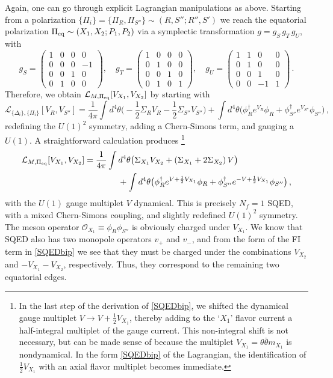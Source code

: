 \documentclass[hyper,letterpaper]{JHEP3}
\numberwithin{equation}{section}
\newcommand{\be}{\begin{equation}}
\newcommand{\ee}{\end{equation}}
\newcommand{\CL}{\mathcal{L}}
\newcommand{\CO}{\mathcal{O}}
\begin{document}
Again, one can go through explicit Lagrangian manipulations as above. Starting from a polarization $\{\Pi_i\}=\{\Pi_R,\Pi_{S''}\}\sim (R,S'';R'',S')$ we reach the equatorial polarization $\Pi_{\rm eq}\sim (X_1,X_2;P_1,P_2)$ via a symplectic transformation $g = g_S\,g_T\,g_U$, with
%
\be \label{gbip2}
g_S = \begin{pmatrix} 1&0&0&0\\0&0&0&-1\\0&0&1&0\\0&1&0&0\end{pmatrix},\quad
g_T = \begin{pmatrix} 1&0&0&0\\0&1&0&0\\0&0&1&0\\0&1&0&1\end{pmatrix},\quad
g_U = \begin{pmatrix} 1&1&0&0\\0&1&0&0\\0&0&1&0\\0&0&-1&1 \end{pmatrix}\,.
\ee
%
Therefore, we obtain $\CL_{M,\Pi_{\rm eq}}[V_{X_1},V_{X_2}]$ by starting with
%
\be \CL_{\{\Delta_i\},\{\Pi_i\}}[V_R,V_{S''}]=\frac{1}{4\pi}\int d^4\theta\Big(-\frac12 \Sigma_RV_R-\frac12 \Sigma_{S''}V_{S''}\Big)+ \int d^4\theta \big( \phi_R^\dagger e^{V_R}\phi_R+\phi_{S''}^\dagger e^{V_{S''}}\phi_{S''}\big)\,,\ee
%
redefining the $U(1)^2$ symmetry, adding a Chern-Simons term, and gauging a $U(1)$. A straightforward calculation produces%
%
\footnote{\label{foot:half}%
In the last step of the derivation of \eqref{SQEDbip}, we shifted the dynamical gauge multiplet $V\to V+\frac12 V_{X_1}$, thereby adding to the `$X_1$' flavor current a half-integral multiplet of the gauge current. This non-integral shift is not necessary, but can be made sense of because the multiplet $V_{X_1}=\theta\bar\theta m_{X_1}$ is nondynamical. In the form \eqref{SQEDbip} of the Lagrangian, the identification of $\frac12 V_{X_1}$ with an axial flavor multiplet becomes immediate.} %
%
\begin{align} \CL_{M,\Pi_{\rm eq}}[V_{X_1},V_{X_2}] &= \frac{1}{4\pi}\int d^4\theta\big(\Sigma_{X_1}V_{X_2}+(\Sigma_{X_1}+2\Sigma_{X_2})\,V\big) \notag \\
 &\qquad\qquad +\int d^4\theta\big( \phi_R^\dagger e^{V+\frac12{V_{X_1}}}\phi_R+\phi_{S''}^\dagger e^{-V+\frac12{V_{X_1}}}\phi_{S''}\big)\,, \label{SQEDbip}
\end{align}
%
with the $U(1)$ gauge multiplet $V$ dynamical. This is precisely $N_f=1$ SQED, with a mixed Chern-Simons coupling, and slightly redefined $U(1)^2$ symmetry. The meson operator $\CO_{X_1}\equiv \phi_R\phi_{S''}$ is obviously charged under $V_{X_1}$. We know that SQED also has two monopole operators $v_+$ and $v_-$, and from the form of the FI term in \eqref{SQEDbip} we see that they must be charged under the combinations $V_{X_2}$ and $-V_{X_1}-V_{X_2}$, respectively. Thus, they correspond to the remaining two equatorial edges.
\end{document}
